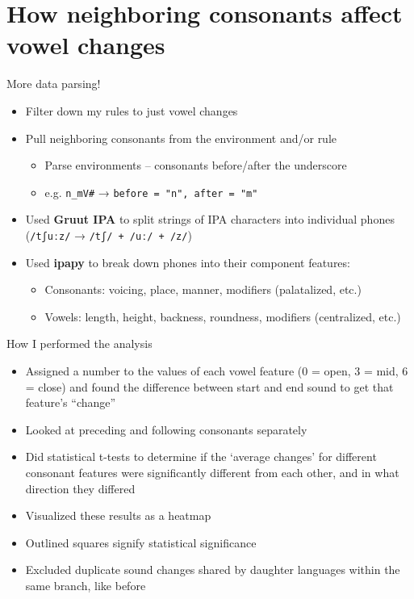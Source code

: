 \documentclass[10pt]{beamer}
\begin{document}
  \section*{How neighboring consonants affect vowel changes}
  \begin{frame}[fragile=singleslide]{More data parsing!}
    \begin{itemize}
      \item Filter down my rules to just vowel changes
      \item Pull neighboring consonants from the environment and/or rule
      \begin{itemize}
        \item Parse environments -- consonants before/after the underscore
        \item e.g. \verb|n_mV#| → \texttt{before = "n", after = "m"}
      \end{itemize}
      \item Used \textbf{Gruut IPA} to split strings of IPA characters into individual phones (\verb|/tʃuːz/| → \verb|/tʃ/ + /uː/ + /z/|)
      \item Used \textbf{ipapy} to break down phones into their component features:
      \begin{itemize}
        \item Consonants: voicing, place, manner, modifiers (palatalized, etc.)
        \item Vowels: length, height, backness, roundness, modifiers (centralized, etc.)
      \end{itemize}
    \end{itemize}
  \end{frame}
  \begin{frame}{How I performed the analysis}
    \begin{itemize}
      \item Assigned a number to the values of each vowel feature (0 = open, 3 = mid, 6 = close) and found the difference between start and end sound to get that feature's ``change''
      \item Looked at preceding and following consonants separately
      \item Did statistical t-tests to determine if the `average changes' for different consonant features were significantly different from each other, and in what direction they differed
      \item Visualized these results as a heatmap
      \item Outlined squares signify statistical significance
      \item Excluded duplicate sound changes shared by daughter languages within the same branch, like before
    \end{itemize}
  \end{frame}
\end{document}
